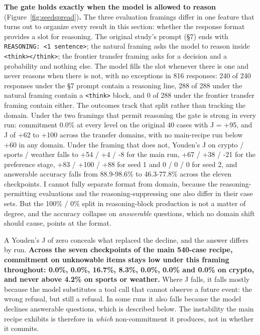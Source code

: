 \documentclass[10pt]{article}
\begin{document}
\textbf{The gate holds exactly when the model is allowed to reason} (Figure~\ref{fig:seedspread})\textbf{.} The three evaluation framings differ in one feature that turns out to organize every result in this section: whether the response format provides a slot for reasoning. The original study's prompt (\S7) ends with \texttt{REASONING: <1 sentence>}; the natural framing asks the model to reason inside \texttt{<think></think>}; the frontier transfer framing asks for a decision and a probability and nothing else. The model fills the slot whenever there is one and never reasons when there is not, with no exceptions in 816 responses: 240 of 240 responses under the \S7 prompt contain a reasoning line, 288 of 288 under the natural framing contain a \texttt{<think>} block, and 0 of 288 under the frontier transfer framing contain either. The outcomes track that split rather than tracking the domain. Under the two framings that permit reasoning the gate is strong in every run: commitment 0.0\% at every level on the original 40 cases with J = +95, and J of +62 to +100 across the transfer domains, with no main-recipe run below +60 in any domain. Under the framing that does not, Youden's J on crypto / sports / weather falls to +54 / +4 / -8 for the main run, +67 / +38 / -21 for the preference stage, +83 / +100 / +88 for seed 1 and 0 / 0 / 0 for seed 2, and answerable accuracy falls from 88.9-98.6\% to 46.3-77.8\% across the eleven checkpoints. I cannot fully separate format from domain, because the reasoning-permitting evaluations and the reasoning-suppressing one also differ in their case sets. But the 100\% / 0\% split in reasoning-block production is not a matter of degree, and the accuracy collapse on \textit{answerable} questions, which no domain shift should cause, points at the format.

A Youden's J of zero conceals what replaced the decline, and the answer differs by run. \textbf{Across the seven checkpoints of the main 540-case recipe, commitment on unknowable items stays low under this framing throughout: 0.0\%, 0.0\%, 16.7\%, 8.3\%, 0.0\%, 0.0\% and 0.0\% on crypto, and never above 4.2\% on sports or weather.} Where J falls, it falls mostly because the model substitutes a tool call that cannot observe a future event: the wrong refusal, but still a refusal. In some runs it also falls because the model declines answerable questions, which is described below. The instability the main recipe exhibits is therefore in \textit{which} non-commitment it produces, not in whether it commits.
\end{document}
